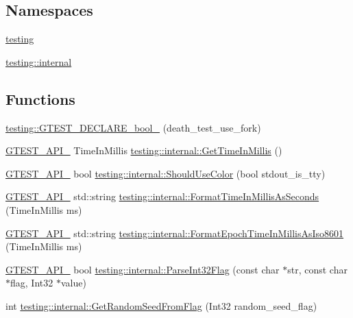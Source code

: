 \subsection*{Namespaces}
\begin{DoxyCompactItemize}
\item 
\hyperlink{namespacetesting}{testing}
\item 
\hyperlink{namespacetesting_1_1internal}{testing\-::internal}
\end{DoxyCompactItemize}
\subsection*{Functions}
\begin{DoxyCompactItemize}
\item 
\hyperlink{namespacetesting_a534f0743e7c42c55d27dcd0dd3d38f18}{testing\-::\-G\-T\-E\-S\-T\-\_\-\-D\-E\-C\-L\-A\-R\-E\-\_\-bool\-\_\-} (death\-\_\-test\-\_\-use\-\_\-fork)
\item 
\hyperlink{gtest-port_8h_aa73be6f0ba4a7456180a94904ce17790}{G\-T\-E\-S\-T\-\_\-\-A\-P\-I\-\_\-} Time\-In\-Millis \hyperlink{namespacetesting_1_1internal_ae66b46943a429e6efb1db456d4cae90c}{testing\-::internal\-::\-Get\-Time\-In\-Millis} ()
\item 
\hyperlink{gtest-port_8h_aa73be6f0ba4a7456180a94904ce17790}{G\-T\-E\-S\-T\-\_\-\-A\-P\-I\-\_\-} bool \hyperlink{namespacetesting_1_1internal_ac1db1b4603967a6c4404f31cbbac31a6}{testing\-::internal\-::\-Should\-Use\-Color} (bool stdout\-\_\-is\-\_\-tty)
\item 
\hyperlink{gtest-port_8h_aa73be6f0ba4a7456180a94904ce17790}{G\-T\-E\-S\-T\-\_\-\-A\-P\-I\-\_\-} std\-::string \hyperlink{namespacetesting_1_1internal_a904485f27a54be8a5a92856e2d838797}{testing\-::internal\-::\-Format\-Time\-In\-Millis\-As\-Seconds} (Time\-In\-Millis ms)
\item 
\hyperlink{gtest-port_8h_aa73be6f0ba4a7456180a94904ce17790}{G\-T\-E\-S\-T\-\_\-\-A\-P\-I\-\_\-} std\-::string \hyperlink{namespacetesting_1_1internal_a5ef227c4a610e7ff638b12dfb25b068e}{testing\-::internal\-::\-Format\-Epoch\-Time\-In\-Millis\-As\-Iso8601} (Time\-In\-Millis ms)
\item 
\hyperlink{gtest-port_8h_aa73be6f0ba4a7456180a94904ce17790}{G\-T\-E\-S\-T\-\_\-\-A\-P\-I\-\_\-} bool \hyperlink{namespacetesting_1_1internal_ae3449e173767750b613114ceac6d916a}{testing\-::internal\-::\-Parse\-Int32\-Flag} (const char $\ast$str, const char $\ast$flag, Int32 $\ast$value)
\item 
int \hyperlink{namespacetesting_1_1internal_ae74fedbdaebaac8d1202192266243b9e}{testing\-::internal\-::\-Get\-Random\-Seed\-From\-Flag} (Int32 random\-\_\-seed\-\_\-flag)

\end{DoxyCompactItemize}
